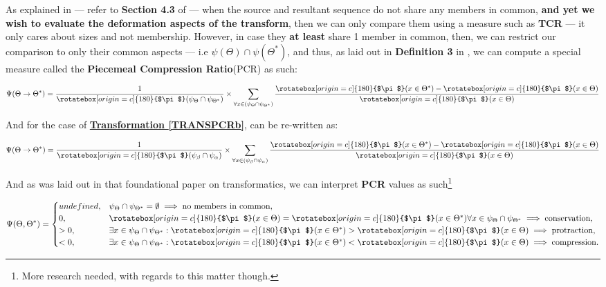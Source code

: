 \documentclass[a4paper, 18pt]{book} %
\newcommand{\invpi}{\rotatebox[origin=c]{180}{$\pi$}}
\begin{document}
\begin{appendices}
As explained in \cite{transformatics} --- refer to \textbf{Section 4.3} of \cite{transformatics} --- when the source and resultant sequence do not share any members in common, \textbf{and yet we wish to evaluate the deformation aspects of the transform}, then we can only compare them using a measure such as \textbf{TCR} --- it only cares about sizes and not membership. However, in case they \textbf{at least} share 1 member in common, then, we can restrict our comparison to only their common aspects --- i.e $\psi(\Theta) \cap \psi(\Theta^*)$, and thus, as laid out in \textbf{Definition 3} in \cite{transformatics}, we can compute a special measure called the \textbf{Piecemeal Compression Ratio}(PCR) as such:

\vspace{1em}
\begin{equation}
\label{EQPCRb}
\Psi(\Theta \rightarrow \Theta^*) = \frac{1}{\invpi(\psi_\Theta \cap \psi_{\Theta^*})} \times \sum\limits_{\forall x \in (\psi_\Theta \cap \psi_{\Theta^*})} \frac{\invpi(x \in \Theta^*) - \invpi(x \in \Theta)}{\invpi(x \in \Theta)}
\end{equation}
\vspace{1em}

And for the case of \textbf{\hyperref[TRANSPCRb]{Transformation \ref{TRANSPCRb}}}, can be re-written as:

\vspace{1em}
\begin{equation}
\label{EQPCR2b}
\Psi(\Theta \rightarrow \Theta^*) = \frac{1}{\invpi(\psi_\beta \cap \psi_\alpha)} \times \sum\limits_{\forall x \in (\psi_\beta \cap \psi_\alpha)} \frac{\invpi(x \in \Theta^*) - \invpi(x \in \Theta)}{\invpi(x \in \Theta)}
\end{equation}
\vspace{1em}

And as was laid out in that foundational paper on transformatics\cite{transformatics}, we can interpret \textbf{PCR} values as such\footnote{More research needed, with regards to this matter though.}

\vspace{1em}
\begin{equation}
\label{EQPCRCASESb}
\Psi(\Theta,\Theta^*) = \begin{cases}
undefined, & \psi_\Theta \cap \psi_{\Theta^*} = \emptyset \implies \text{no members in common},\\
0, & \invpi(x \in \Theta) = \invpi(x \in \Theta^*) \forall x \in \psi_\Theta \cap \psi_{\Theta^*} \implies \text{conservation},\\
> 0, & \exists x \in \psi_\Theta \cap \psi_{\Theta^*}: \invpi(x \in \Theta^*) > \invpi(x \in \Theta) \implies \text{protraction},\\
< 0, & \exists x \in \psi_\Theta \cap \psi_{\Theta^*}: \invpi(x \in \Theta^*) < \invpi(x \in \Theta) \implies \text{compression}.
\end{cases}
\end{equation}
\vspace{1em}



\end{appendices}
\end{document}
